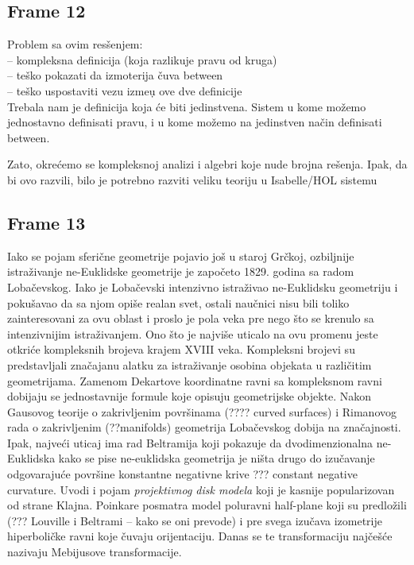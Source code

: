 \documentclass{article}
\begin{document}
\subsection{Frame 12}   

Problem sa ovim res\v senjem: \\
-- kompleksna definicija (koja razlikuje pravu od kruga) \\
-- te\v sko pokazati da izmoterija \v cuva between \\
-- te\v sko uspostaviti vezu izme\d u ove dve definicije \\

Trebala nam je definicija koja \'ce biti jedinstvena. Sistem u kome mo\v zemo jednostavno definisati pravu, i u kome mo\v zemo na jedinstven na\v cin
definisati between. 

Zato, okre\'cemo se kompleksnoj analizi i algebri koje nude brojna re\v senja. Ipak, da bi ovo razvili, bilo je potrebno razviti veliku teoriju u Isabelle/HOL sistemu

\subsection{Frame 13}

Iako se pojam sferi\v cne geometrije pojavio jo\v s u staroj Gr\v
ckoj, ozbiljnije istra\v zivanje ne-Euklidske geometrije je zapo\v
ceto 1829. godina sa radom Loba\v cevskog. Iako je Loba\v cevski
intenzivno istra\v zivao ne-Euklidsku geometriju i poku\v savao da sa
njom opi\v se realan svet, ostali nau\v cnici nisu bili toliko
zainteresovani za ovu oblast i proslo je pola veka pre nego \v sto se
krenulo sa intenzivnijim istra\v zivanjem.  Ono \v sto je najvi\v se
uticalo na ovu promenu jeste otkri\'ce kompleksnih brojeva krajem
{\lat XVIII} veka. Kompleksni brojevi su predstavljali zna\v cajanu
alatku za istra\v zivanje osobina objekata u razli\v citim
geometrijama. Zamenom Dekartove koordinatne ravni sa kompleksnom ravni
dobijaju se jednostavnije formule koje opisuju geometrijske
objekte. Nakon Gausovog teorije o zakrivljenim povr\v sinama (???? {\lat
curved surfaces}) i Rimanovog rada o zakrivljenim (??{\lat manifolds})
geometrija Loba\v cevskog dobija na zna\v cajnosti. Ipak, najve\' ci
uticaj ima rad Beltramija koji pokazuje da dvodimenzionalna
ne-Euklidska {\lat kako se pise ne-euklidska} geometrija je ni\v sta
drugo do izu\v cavanje odgovaraju\' ce povr\v sine konstantne
negativne krive ??? {\lat constant negative curvature}. Uvodi i pojam
{\em projektivnog disk modela} koji je kasnije popularizovan od strane
Klajna. Poinkare posmatra model poluravni {\lat half-plane} koji su
predlo\v zili {\lat (??? Louville i Beltrami -- kako se oni prevode)} i pre  
svega izu\v cava
izometrije hiperboli\v cke ravni koje \v cuvaju orijentaciju. Danas se
te transformaciju naj\v ce\v s\'ce nazivaju Mebijusove transformacije.
\end{document}

